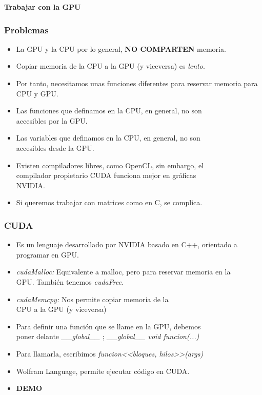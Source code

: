 \documentclass[aspectratio=169]{beamer}
\begin{document}
\begin{frame}
	\centering \LARGE \bfseries \color{naranjaUCA} Trabajar con la GPU
\end{frame}

\begin{frame}
	\frametitle{Problemas}
	
	\begin{itemize}
		\item La GPU y la CPU por lo general, \textbf{NO COMPARTEN} memoria. \pause
		\item Copiar memoria de la CPU a la GPU (y viceversa) es \textit{lento}.\pause
		\item Por tanto, necesitamos unas funciones diferentes para reservar memoria para CPU y GPU. \pause
		\item Las funciones que definamos en la CPU, en general, no son\\ accesibles por la GPU. \pause
		\item Las variables que definamos en la CPU, en general, no son \\accesibles desde la GPU. \pause
		\item Existen compiladores libres, como OpenCL, sin embargo, el \\compilador propietario CUDA funciona mejor en gráficas\\ NVIDIA.
		\pause
		\item Si queremos trabajar con matrices como en C, se complica.
	\end{itemize}
\end{frame}

\begin{frame}
	\frametitle{CUDA}
	
	\begin{itemize}
		\item Es un lenguaje desarrollado por NVIDIA basado en C++, orientado a programar en GPU. \pause
		\item \textit{cudaMalloc: } Equivalente a malloc, pero para reservar memoria en la \\GPU. También tenemos \textit{cudaFree}.\pause
		\item \textit{cudaMemcpy: } Nos permite copiar memoria de la \\CPU a la GPU (y viceversa) \pause
		\item Para definir una función que se llame en la GPU, debemos\\ poner delante \textit{\_\_global\_\_} ; \pause \textit{\_\_global\_\_ void funcion(...)} \pause
		\item Para llamarla, escribimos \textit{funcion<<bloques, hilos>>(args)} \pause
		\item Wolfram Language, permite ejecutar código en CUDA.\pause
		\item \textbf{DEMO}
	\end{itemize}
\end{frame}
\end{document}
